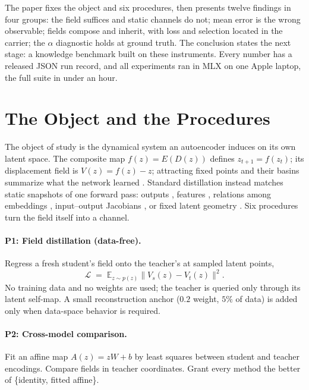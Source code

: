 \documentclass[11pt]{article}
\newcommand{\enc}{E}
\newcommand{\dec}{D}
\newcommand{\Vfield}{V}
\begin{document}
The paper fixes the object and six procedures, then presents twelve findings in four groups: the field suffices and static channels do not; mean error is the wrong observable; fields compose and inherit, with loss and selection located in the carrier; the $\alpha$ diagnostic holds at ground truth. The conclusion states the next stage: a knowledge benchmark built on these instruments. Every number has a released JSON run record, and all experiments ran in MLX on one Apple laptop, the full suite in under an hour.

\section{The Object and the Procedures}

The object of study is the dynamical system an autoencoder induces on its own latent space. The composite map $f(z) = \enc(\dec(z))$ defines $z_{t+1} = f(z_t)$; its displacement field is $\Vfield(z) = f(z) - z$; attracting fixed points and their basins summarize what the network learned \citep{fumero2025}. Standard distillation instead matches static snapshots of one forward pass: outputs \citep{hinton2015}, features \citep{romero2015fitnets}, relations among embeddings \citep{park2019rkd,tung2019similarity,tian2020crd}, input--output Jacobians \citep{srinivas2018jacobian}, or fixed latent geometry \citep{medal2026,latentmanifolds2026}. Six procedures turn the field itself into a channel.

\paragraph{P1: Field distillation (data-free).} Regress a fresh student's field onto the teacher's at sampled latent points,
\begin{equation}
  \mathcal{L} \;=\; \mathbb{E}_{z \sim p(z)} \big\| \Vfield_s(z) - \Vfield_t(z) \big\|^2 .
\end{equation}
No training data and no weights are used; the teacher is queried only through its latent self-map. A small reconstruction anchor ($0.2$ weight, $5\%$ of data) is added only when data-space behavior is required.

\paragraph{P2: Cross-model comparison.} Fit an affine map $A(z) = zW + b$ by least squares between student and teacher encodings. Compare fields in teacher coordinates. Grant every method the better of \{identity, fitted affine\}.
\end{document}
